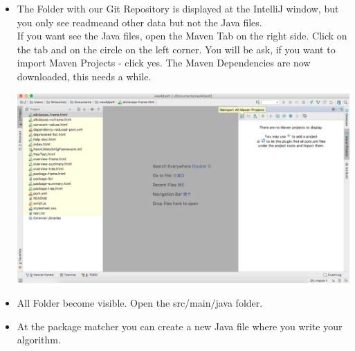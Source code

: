 \begin{itemize}
	\item The Folder with our \glqq Git Repository\grqq{} is displayed at the \glqq IntelliJ\grqq{} window, but you only see \glqq readme\grqq{}and other data but not the Java files. \\
	If you want see the Java files, open the Maven Tab on the right side. Click on the tab and on the circle on the left corner. You will be ask, if you want to \glqq import Maven Projects\grqq{} - click \glqq yes\grqq{}. The \glqq Maven Dependencies\grqq{} are now downloaded, this needs a while.
	\begin{center}
		\includegraphics[width=14.5cm]{common/MavenImport.png}\setlength{\unitlength}{1mm}
	\end{center}
	\item All Folder become visible. Open the src/main/java folder.
	\item At the \glqq package matcher\grqq{} you can create a new Java file where you write your algorithm.
\end{itemize}

